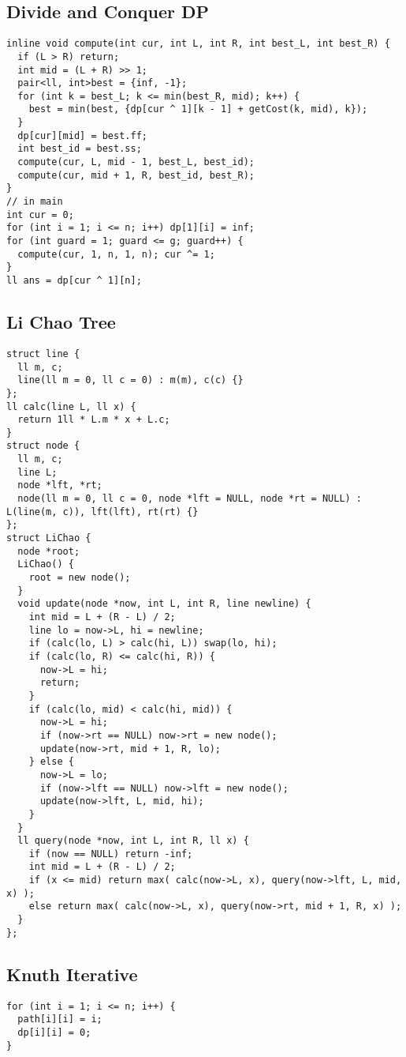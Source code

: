\documentclass[10pt,a4paper,onesided]{article}
\begin{document}
\begin{multicols*}{3}
\subsection{Divide and Conquer DP}
\begin{lstlisting}
inline void compute(int cur, int L, int R, int best_L, int best_R) {
  if (L > R) return;
  int mid = (L + R) >> 1;
  pair<ll, int>best = {inf, -1};
  for (int k = best_L; k <= min(best_R, mid); k++) {
    best = min(best, {dp[cur ^ 1][k - 1] + getCost(k, mid), k});
  }
  dp[cur][mid] = best.ff;
  int best_id = best.ss;
  compute(cur, L, mid - 1, best_L, best_id);
  compute(cur, mid + 1, R, best_id, best_R);
}
// in main
int cur = 0;
for (int i = 1; i <= n; i++) dp[1][i] = inf;
for (int guard = 1; guard <= g; guard++) {
  compute(cur, 1, n, 1, n); cur ^= 1;
}
ll ans = dp[cur ^ 1][n];
\end{lstlisting}
\subsection{Li Chao Tree}
\begin{lstlisting}
struct line {
  ll m, c;
  line(ll m = 0, ll c = 0) : m(m), c(c) {}
};
ll calc(line L, ll x) {
  return 1ll * L.m * x + L.c;
}
struct node {
  ll m, c;
  line L;
  node *lft, *rt;
  node(ll m = 0, ll c = 0, node *lft = NULL, node *rt = NULL) : L(line(m, c)), lft(lft), rt(rt) {}
};
struct LiChao {
  node *root;
  LiChao() {
    root = new node();
  }
  void update(node *now, int L, int R, line newline) {
    int mid = L + (R - L) / 2;
    line lo = now->L, hi = newline;
    if (calc(lo, L) > calc(hi, L)) swap(lo, hi);
    if (calc(lo, R) <= calc(hi, R)) {
      now->L = hi;
      return;
    }
    if (calc(lo, mid) < calc(hi, mid)) {
      now->L = hi;
      if (now->rt == NULL) now->rt = new node();
      update(now->rt, mid + 1, R, lo);
    } else {
      now->L = lo;
      if (now->lft == NULL) now->lft = new node();
      update(now->lft, L, mid, hi);
    }
  }
  ll query(node *now, int L, int R, ll x) {
    if (now == NULL) return -inf;
    int mid = L + (R - L) / 2;
    if (x <= mid) return max( calc(now->L, x), query(now->lft, L, mid, x) );
    else return max( calc(now->L, x), query(now->rt, mid + 1, R, x) );
  }
};
\end{lstlisting}
\subsection{Knuth Iterative}
\begin{lstlisting}
for (int i = 1; i <= n; i++) {
  path[i][i] = i;
  dp[i][i] = 0;
}


\end{lstlisting}
\end{multicols*}
\end{document}

